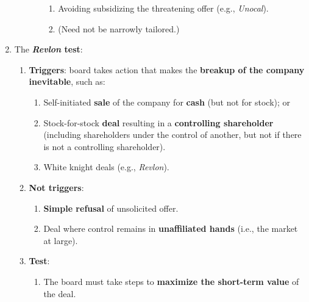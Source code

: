 \begin{enumerate}
\begin{enumerate}
\begin{enumerate}
\begin{enumerate}
                \item Avoiding subsidizing the threatening offer (e.g., 
                \emph{Unocal}).
                \item (Need not be narrowly tailored.)
            \end{enumerate}
        \end{enumerate}
    \end{enumerate}
    \item The \textbf{\emph{Revlon} test}:
    \begin{enumerate}
        \item \textbf{Triggers}: board takes action that makes the 
        \textbf{breakup of the company inevitable}, such as:
        \begin{enumerate}
            \item Self-initiated \textbf{sale} of the company for 
            \textbf{cash} (but not for stock); or
            \item Stock-for-stock \textbf{deal} resulting in a 
            \textbf{controlling shareholder} (including shareholders under the 
            control of another, but not if there is not a controlling 
            shareholder).
            \item White knight deals (e.g., \emph{Revlon}).
        \end{enumerate}
        \item \textbf{Not triggers}:
        \begin{enumerate}
            \item \textbf{Simple refusal} of unsolicited offer.
            \item Deal where control remains in \textbf{unaffiliated hands} 
            (i.e., the market at large).
        \end{enumerate}
        \item \textbf{Test}:
        \begin{enumerate}
            \item The board must take steps to \textbf{maximize the short-term 
            value} of the deal.
        \end{enumerate}
    \end{enumerate}
\end{enumerate}
